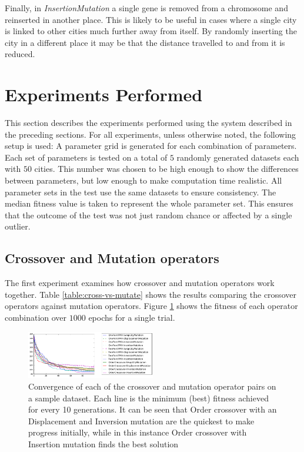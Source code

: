 \documentclass[journal]{IEEEtran}
\begin{document}
Finally, in \textit{InsertionMutation} a single gene is removed from a chromosome and reinserted in another place. This is likely to be useful in cases where a single city is linked to other cities much further away from itself. By randomly inserting the city in a different place it may be that the distance travelled to and from it is reduced.

\section{Experiments Performed}
\label{sec:experiments}
This section describes the experiments performed using the system described in the preceding sections. For all experiments, unless otherwise noted, the following setup is used: A parameter grid is generated for each combination of parameters. Each set of parameters is tested on a total of $5$ randomly generated datasets each with $50$ cities. This number was chosen to be high enough to show the differences between parameters, but low enough to make computation time realistic. All parameter sets in the test use the same datasets to ensure consistency. The median fitness value is taken to represent the whole parameter set. This ensures that the outcome of the test was not just random chance or affected by a single outlier. 

\subsection{Crossover and Mutation operators}
\label{subsec:cross-vs-mutate-operators}
The first experiment examines how crossover and mutation operators work together. Table \ref{table:cross-vs-mutate} shows the results comparing the crossover operators against mutation operators. Figure \ref{fig:cross-vs-mutate} shows the fitness of each operator combination over $1000$ epochs for a single trial.

\begin{figure}[H]
\centering
\includegraphics[width=0.5\textwidth]{figures/cross_vs_mutate_convergence.png}
\caption{Convergence of each of the crossover and mutation operator pairs on a sample dataset. Each line is the minimum (best) fitness achieved for every 10 generations. It can be seen that Order crossover with an Displacement and Inversion mutation are the quickest to make progress initially, while in this instance Order crossover with Insertion mutation finds the best solution}
\label{fig:cross-vs-mutate}
\end{figure}
\end{document}
